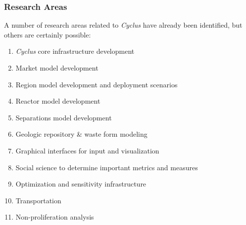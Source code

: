 \documentclass[letterpaper,10pt,english]{sphinxmanual}
\begin{document}
\subsubsection{Research Areas}
\label{basics/roadmap:research-areas}
A number of research areas related to \emph{Cyclus} have already been
identified, but others are certainly possible:
\begin{enumerate}
\item {} 
\emph{Cyclus} core infrastructure development

\item {} 
Market model development

\item {} 
Region model development and deployment scenarios

\item {} 
Reactor model development

\item {} 
Separations model development

\item {} 
Geologic repository \& waste form modeling

\item {} 
Graphical interfaces for input and visualization

\item {} 
Social science to determine important metrics and measures

\item {} 
Optimization and sensitivity infrastructure

\item {} 
Transportation

\item {} 
Non-proliferation analysis

\end{enumerate}
\end{document}
